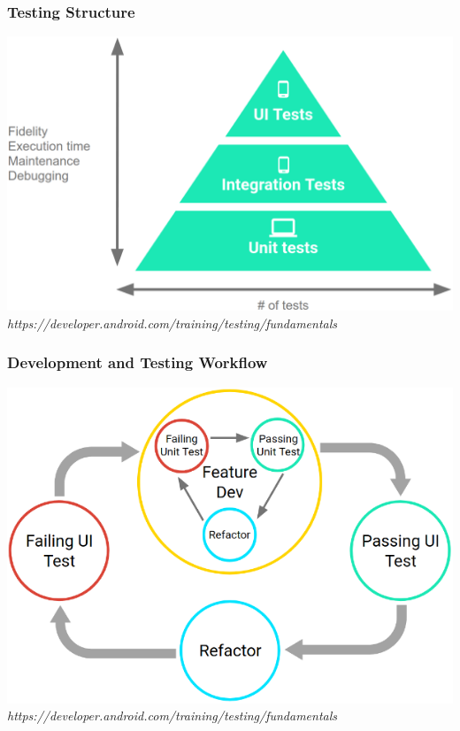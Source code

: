 \documentclass[10pt]{beamer}
\begin{document}
\begin{frame}
    \frametitle{Testing Structure}
    \center\includegraphics[scale=0.25]{3rd_party/pyramid_2x}
    \tiny\emph{https://developer.android.com/training/testing/fundamentals}
\end{frame}

\begin{frame}
    \frametitle{Development and Testing Workflow}
    \center\includegraphics[scale=0.5]{3rd_party/testing-workflow}
    \tiny\emph{https://developer.android.com/training/testing/fundamentals}
\end{frame}
\end{document}
